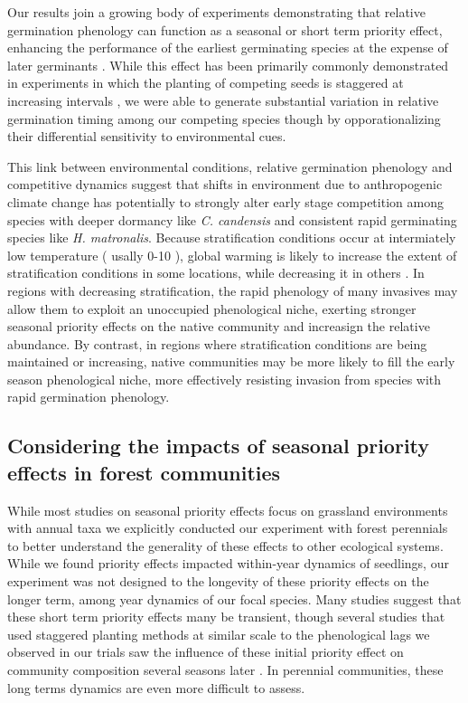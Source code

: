 \documentclass{article}\usepackage[]{graphicx}\usepackage[]{color}
\begin{document}
Our results join a growing body of experiments demonstrating that relative germination phenology can function as a seasonal or short term priority effect, enhancing the performance of the earliest germinating species at the expense of later germinants \citep{}. While this effect has been primarily commonly demonstrated in experiments in which the planting of competing seeds is staggered at increasing intervals \citep{}, we were able to generate substantial variation in relative germination timing among our competing species though by opporationalizing their differential sensitivity to environmental cues. 

This link between environmental conditions, relative germination phenology and competitive dynamics suggest that shifts in environment due to anthropogenic climate change has potentially to strongly alter early stage competition among species with deeper dormancy like \textit{C. candensis} and consistent rapid germinating species like \textit{H. matronalis}. Because stratification conditions occur at intermiately low temperature ( usally 0-10  \degreeC \citep{}), global warming is likely to increase the extent of stratification conditions in some locations, while decreasing it in others \citep{}. In regions with decreasing stratification, the rapid phenology of many invasives may allow them to exploit an unoccupied phenological niche, exerting stronger seasonal priority effects on the native community and increasign the relative abundance. By contrast, in regions where stratification conditions are being maintained or increasing, native communities may be more likely to fill the early season phenological niche, more effectively resisting invasion from species with rapid germination phenology.

\subsection*{Considering the impacts of seasonal priority effects in forest communities}
While most studies on seasonal priority effects focus on grassland environments with annual taxa \citep{} we explicitly conducted our experiment with forest perennials to better understand the generality of these effects to other ecological systems. While we found priority effects impacted within-year dynamics of seedlings, our experiment was not designed to the longevity of these priority effects on the longer term, among year dynamics of our focal species. Many studies suggest that these short term priority effects many be transient, though several studies that used staggered planting methods at similar scale to the phenological lags we observed in our trials saw the influence of these initial priority effect on community composition several seasons later \citep{}.  In perennial communities, these long terms dynamics are even more difficult to assess.
\end{document}
